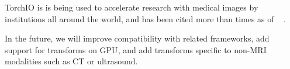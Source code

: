 TorchIO is is being used to accelerate research with medical images by institutions all around the world, and has been cited more than \torchiocitations times as of \monthname~\the\year%
.

In the future, we will improve compatibility with related frameworks, add support for transforms on \ac{GPU}, and add transforms specific to non-\ac{MRI} modalities such as \acs{CT} or ultrasound.

